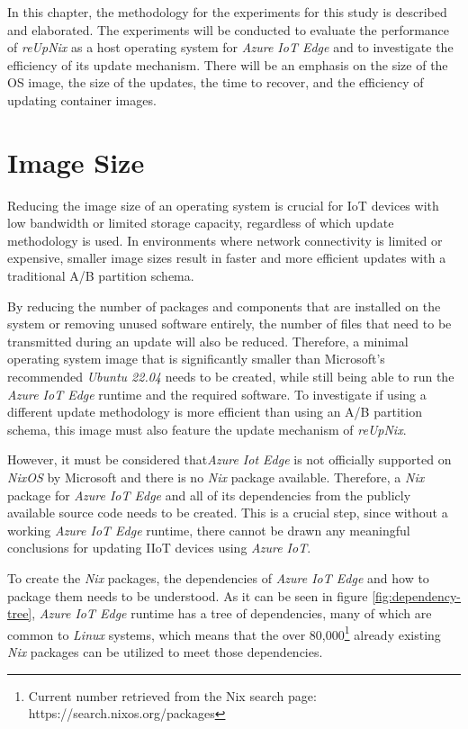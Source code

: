 
In this chapter, the methodology for the experiments for this study
is described and elaborated. The experiments will be conducted to evaluate the performance of
\textit{reUpNix} as a host
operating system for \textit{Azure IoT Edge} and to investigate the efficiency
of its update mechanism. There will be an emphasis on the size of the \ac{OS}
image, the size of the updates, the time to recover, and the efficiency of
updating container images.

\section{Image Size}
\label{sec:image-size}
Reducing the image size of an operating system is crucial for \ac{IoT} devices
with low bandwidth or limited storage capacity, regardless of which update
methodology is used. In environments where network connectivity is limited or expensive,
smaller image sizes result in faster and more efficient updates with a traditional
A/B partition schema.

By reducing the number of packages and components that are installed on the
system or removing unused software entirely, the number of files that need to
be transmitted during an update will also be reduced. Therefore,
a minimal operating system image that is significantly smaller
than Microsoft's recommended \textit{Ubuntu 22.04} needs to be created, while
still being able to run the
\textit{Azure IoT Edge} runtime and the required software. To investigate if using
a different update methodology is more efficient than using an A/B partition schema,
this image must also feature the update mechanism of \textit{reUpNix}.

However, it must be considered that\textit{Azure Iot Edge} is not officially
supported on \textit{NixOS}
by Microsoft and there is no \textit{Nix} package available. Therefore, a \textit{Nix} package
for \textit{Azure IoT Edge} and all of its dependencies from the publicly available source code
needs to be created. This is a crucial step, since
without a working \textit{Azure IoT Edge} runtime, there cannot be drawn any meaningful
conclusions for updating \ac{IIoT} devices using \textit{Azure IoT}.

To create the \textit{Nix} packages, the dependencies of
\textit{Azure IoT Edge} and how to package them needs to be understood.
As it can be seen in figure
\ref{fig:dependency-tree}, \textit{Azure IoT Edge} runtime has a tree of dependencies,
many of which are common to \textit{Linux} systems, which means that the over
80,000\footnote{Current number retrieved from the Nix search page: https://search.nixos.org/packages}
already existing \textit{Nix} packages can be utilized to meet those dependencies.

